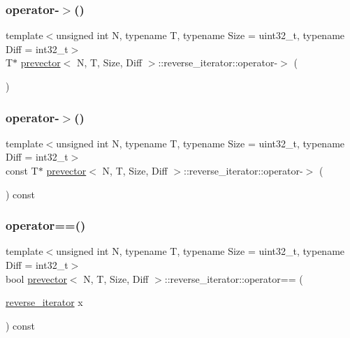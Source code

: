 \subsubsection{\texorpdfstring{operator-\/$>$()}{operator->()}\hspace{0.1cm}{\footnotesize\ttfamily [1/2]}}
{\footnotesize\ttfamily template$<$unsigned int N, typename T, typename Size = uint32\+\_\+t, typename Diff = int32\+\_\+t$>$ \\
T$\ast$ \mbox{\hyperlink{classprevector}{prevector}}$<$ N, T, Size, Diff $>$\+::reverse\+\_\+iterator\+::operator-\/$>$ (\begin{DoxyParamCaption}{ }\end{DoxyParamCaption})\hspace{0.3cm}{\ttfamily [inline]}}

\mbox{\label{classprevector_1_1reverse__iterator_a20b6d44e5c7788fdc906b50c926acfb0}} 
\subsubsection{\texorpdfstring{operator-\/$>$()}{operator->()}\hspace{0.1cm}{\footnotesize\ttfamily [2/2]}}
{\footnotesize\ttfamily template$<$unsigned int N, typename T, typename Size = uint32\+\_\+t, typename Diff = int32\+\_\+t$>$ \\
const T$\ast$ \mbox{\hyperlink{classprevector}{prevector}}$<$ N, T, Size, Diff $>$\+::reverse\+\_\+iterator\+::operator-\/$>$ (\begin{DoxyParamCaption}{ }\end{DoxyParamCaption}) const\hspace{0.3cm}{\ttfamily [inline]}}

\mbox{\label{classprevector_1_1reverse__iterator_af18719632237a298ba4145fc677b05d8}} 
\subsubsection{\texorpdfstring{operator==()}{operator==()}}
{\footnotesize\ttfamily template$<$unsigned int N, typename T, typename Size = uint32\+\_\+t, typename Diff = int32\+\_\+t$>$ \\
bool \mbox{\hyperlink{classprevector}{prevector}}$<$ N, T, Size, Diff $>$\+::reverse\+\_\+iterator\+::operator== (\begin{DoxyParamCaption}\item[{\mbox{\hyperlink{classprevector_1_1reverse__iterator}{reverse\+\_\+iterator}}}]{x }\end{DoxyParamCaption}) const\hspace{0.3cm}{\ttfamily [inline]}}



